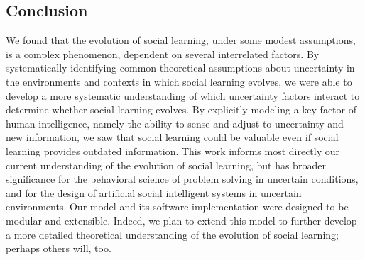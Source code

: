 \documentclass[letterpaper,11.5pt]{scrartcl}
\begin{document}


\subsection{Conclusion}

We found that the evolution of social learning, under some modest
assumptions, is a complex phenomenon, dependent on several interrelated factors. By systematically
identifying common theoretical assumptions about uncertainty in the environments and contexts
in which social learning evolves, we were able to develop a more systematic understanding of
which uncertainty factors interact to determine whether social learning evolves. By
explicitly modeling a key factor of human intelligence, namely the ability to sense and
adjust to uncertainty and new information, we saw that social learning could be
valuable even if social learning provides outdated information. This work
informs most directly our current understanding of the evolution of social learning, but has
broader significance for the behavioral science of problem solving in uncertain conditions, and
for the design of artificial social intelligent systems in uncertain environments.  Our model
and its software implementation were designed to be modular and extensible.  Indeed,
we plan to extend this model to further develop a more detailed theoretical understanding of
the evolution of social learning; perhaps others will, too.
\end{document}
